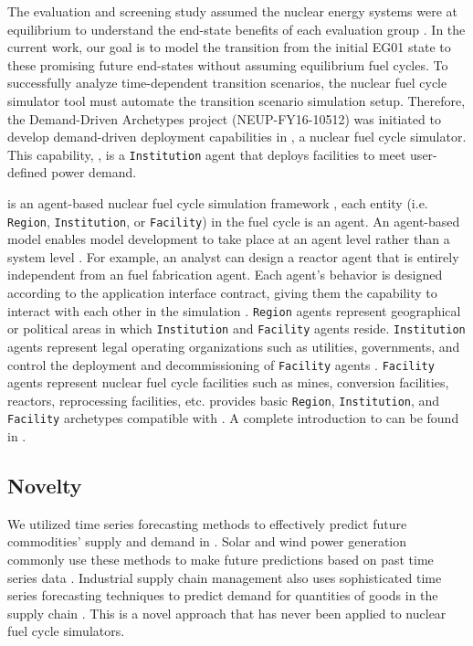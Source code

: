The evaluation and screening study assumed
the nuclear energy systems were at equilibrium to understand 
the end-state benefits of each evaluation group \cite{feng_standardized_2016}. 
In the current work, our goal is to model the transition from the initial EG01
state to these promising future end-states without assuming equilibrium
fuel cycles. 
To successfully analyze time-dependent transition
scenarios, the nuclear fuel cycle simulator tool must 
automate the transition scenario simulation setup. 
Therefore, the Demand-Driven \Cycamore Archetypes project
(NEUP-FY16-10512) was initiated to develop 
demand-driven deployment capabilities in \Cyclus, 
a nuclear fuel cycle simulator. 
This capability, \deploy, is a \Cyclus \texttt{Institution}
agent that deploys facilities to meet user-defined power demand. 

\Cyclus is an agent-based nuclear fuel cycle simulation framework 
\cite{huff_fundamental_2016}, 
each entity (i.e. \texttt{Region}, \texttt{Institution}, or \texttt{Facility}) in the 
fuel cycle is an agent. 
An agent-based model enables model development to take place at an agent level 
rather than a system level \cite{huff_fundamental_2016}. 
For example, an analyst can design a reactor agent that is entirely independent 
from an fuel fabrication agent. Each agent's behavior is designed according to the 
application interface contract, giving them the capability to interact with each 
other in the simulation \cite{huff_fundamental_2016}.  
\texttt{Region} agents represent geographical or political areas in which \texttt{Institution}
and \texttt{Facility} agents reside. 
\texttt{Institution} agents represent legal operating organizations such as
utilities, governments, and control the 
deployment and decommissioning of \texttt{Facility} agents
\cite{huff_fundamental_2016}.
\texttt{Facility} agents represent nuclear fuel cycle facilities
such as mines, conversion facilities, reactors, reprocessing facilities, 
etc. 
\Cycamore \cite{carlsen_cycamore_2014}
provides basic \texttt{Region}, \texttt{Institution}, 
and \texttt{Facility} archetypes compatible with \Cyclus. 
A complete introduction to \Cyclus can be found in \cite{huff_fundamental_2016}. 

\subsection{Novelty}
We utilized time series forecasting methods to effectively predict 
future commodities' supply and demand in \deploy. 
Solar and wind power generation commonly use these methods
to make future predictions based on past time series data
\cite{reikard_predicting_2009,diagne_review_2013,soman_review_2010,taylor_wind_2009}. 
Industrial supply chain management also uses sophisticated time series 
forecasting techniques to predict demand for quantities of goods 
in the supply chain \cite{souza_supply_2014}.
This is a novel approach that has never been applied to 
nuclear fuel cycle simulators. 

